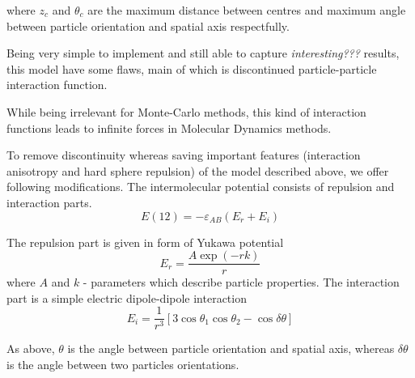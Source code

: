 \documentclass[12pt,a4paper]{article}
\begin{document}
where $z_c$ and $\theta_c$ are the maximum distance between centres and maximum angle between particle orientation and spatial axis respectfully.

Being very simple to implement and still able to capture \emph{interesting???} results, this model have some flaws, main of which is discontinued particle-particle interaction function.

While being irrelevant for Monte-Carlo methods, this kind of interaction functions leads to infinite forces in Molecular Dynamics methods.

To remove discontinuity whereas saving important features (interaction anisotropy and hard sphere repulsion) of the model described above, we offer following modifications.
The intermolecular potential consists of repulsion and interaction parts.
\begin{equation}
E(12) = - \varepsilon_{AB} (E_{r} + E_{i})
\end{equation}

The repulsion part is given in form of Yukawa potential
\begin{equation}
E_{r} = \frac{A \exp(-r k)}{r}
\end{equation}
where $A$ and $k$ - parameters which describe particle properties. The interaction part is a simple electric dipole-dipole interaction
\begin{equation}
E_{i} = \frac{1}{r^3} [3 \cos \theta_1 \cos \theta_2 - \cos \delta \theta]
\end{equation}

As above, $\theta$ is the angle between particle orientation and spatial axis, whereas $\delta \theta$ is the angle between two particles orientations.



\end{document}
